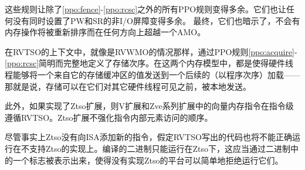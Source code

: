 \begin{commentary}
  这些规则让除了\ref{ppo:fence}-\ref{ppo:rcsc}之外的所有PPO规则变得多余。它们也让任何没有同时设置了PW和SR的非I/O屏障变得多余。
  最终，它们也暗示了，不会有内存操作将被重新排序而在任何方向上超越一个AMO。
  
  在RVTSO的上下文中，就像是RVWMO的情况那样，通过PPO规则\ref{ppo:acquire}-\ref{ppo:rcsc}简明而完整地定义了存储次序。在这两个内存模型中，都是使得硬件线程能够将一个来自它的存储缓冲区的值发送到一个后续的（以程序次序）加载——那就是说，存储可以在它们对其它硬件线程可见之前，被本地发送。
\end{commentary}

此外，如果实现了Ztso扩展，则V扩展和Zve系列扩展中的向量内存指令在指令级遵循RVTSO。Ztso扩展不强化指令内部元素访问的顺序。

尽管事实上Ztso没有向ISA添加新的指令，假定RVTSO写出的代码也将不能正确运行在不支持Ztso的实现上。编译的二进制只能运行在Ztso下，这应当通过二进制中的一个标志被表示出来，使得没有实现Ztso的平台可以简单地拒绝运行它们。
